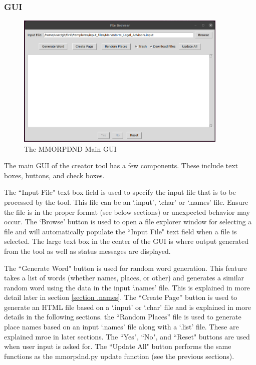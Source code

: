 \subsubsection{GUI}

\begin{figure}[h]
	\centering
	\includegraphics[width=0.9\textwidth]{images/creator_gui.png}
	\caption{The MMORPDND Main GUI}
	\label{fig:creator_gui}
\end{figure}

The main GUI of the creator tool has a few components. These include text boxes, buttons, and check boxes. 

The ``Input File" text box field is used to specify the input file that is to be processed by the tool. This file can be an `.input', `.char' or `.names' file. Ensure the file is in the proper format (see below sections) or unexpected behavior may occur. The `Browse' button is used to open a file explorer window for selecting a file and will automatically populate the ``Input File" text field when a file is selected. The large text box in the center of the GUI is where output generated from the tool as well as status messages are displayed.

The ``Generate Word" button is used for random word generation. This feature takes a list of words (whether names, places, or other) and generates a similar random word using the data in the input `.names' file. This is explained in more detail later in section \ref{section .names}. The ``Create Page'' button is used to generate an HTML file based on a `.input' or `.char' file and is explained in more details in the following sections. the ``Random Places'' file is used to generate place names based on an input `.names' file along with a `.list' file. These are explained mroe in later sections. The ``Yes", ``No", and ``Reset" buttons are used when user input is asked for. The ``Update All" button performs the same functions as the mmorpdnd.py update function (see the previous sections).

